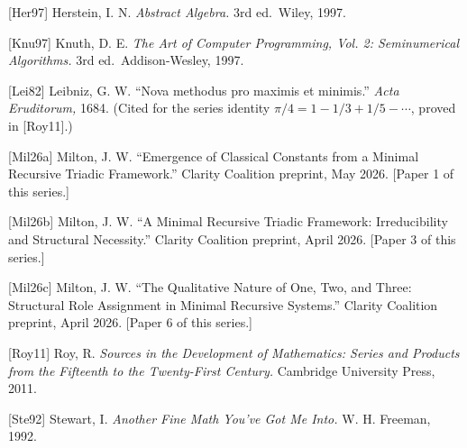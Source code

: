 \documentclass[
  11pt,
  letterpaper,
]{article}
\begin{document}
{[}Her97{]} Herstein, I. N. \emph{Abstract Algebra.} 3rd ed.~Wiley,
1997.

{[}Knu97{]} Knuth, D. E. \emph{The Art of Computer Programming, Vol. 2:
Seminumerical Algorithms.} 3rd ed.~Addison-Wesley, 1997.

{[}Lei82{]} Leibniz, G. W. ``Nova methodus pro maximis et minimis.''
\emph{Acta Eruditorum,} 1684. (Cited for the series identity
\(\pi/4 = 1 - 1/3 + 1/5 - \cdots\), proved in {[}Roy11{]}.)

{[}Mil26a{]} Milton, J. W. ``Emergence of Classical Constants from a
Minimal Recursive Triadic Framework.'' Clarity Coalition preprint, May
2026. {[}Paper 1 of this series.{]}

{[}Mil26b{]} Milton, J. W. ``A Minimal Recursive Triadic Framework:
Irreducibility and Structural Necessity.'' Clarity Coalition preprint,
April 2026. {[}Paper 3 of this series.{]}

{[}Mil26c{]} Milton, J. W. ``The Qualitative Nature of One, Two, and
Three: Structural Role Assignment in Minimal Recursive Systems.''
Clarity Coalition preprint, April 2026. {[}Paper 6 of this series.{]}

{[}Roy11{]} Roy, R. \emph{Sources in the Development of Mathematics:
Series and Products from the Fifteenth to the Twenty-First Century.}
Cambridge University Press, 2011.

{[}Ste92{]} Stewart, I. \emph{Another Fine Math You've Got Me Into.} W.
H. Freeman, 1992.
\end{document}
